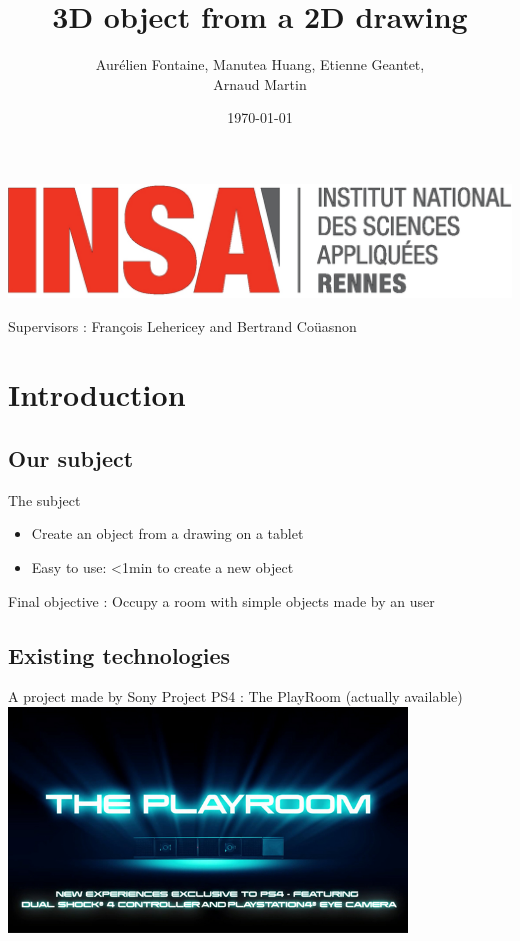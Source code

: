 \documentclass[a4paper,10pt]{beamer}
\title{3D object from a 2D drawing}
\author[Groupe 3INFO]{Aurélien Fontaine, Manutea Huang, Etienne Geantet,\\ Arnaud Martin}
\institute[INSA de Rennes]{Institut National des Sciences Appliquées de Rennes}
\date{\today}
\begin{document}
	\begin{frame}
		\begin{titlepage}
			\centerline{\includegraphics[scale=0.1]{images/logos/logoINSA.jpg}}
			Supervisors : François Lehericey and Bertrand Coüasnon	
		\end{titlepage}
	\end{frame}
	
	\begin{frame}
		\tableofcontents
	\end{frame}
	
	\section{Introduction}
	
		\subsection{Our subject}
	
			\begin{frame}{The subject}
				\begin{itemize}
					\item Create an object from a drawing on a tablet
					\item Easy to use: <1min to create a new object
				\end{itemize}
				Final objective : Occupy a room with simple objects made by an user
			\end{frame}
			
		\subsection{Existing technologies}
			
			\begin{frame}{A project made by Sony}
				Project PS4 : The PlayRoom (actually available)
				\href{run:The_PlayRoom.avi}{\includegraphics[width=300pt]{images/The-Playroom.jpg}}
			\end{frame}
			
\end{document}
